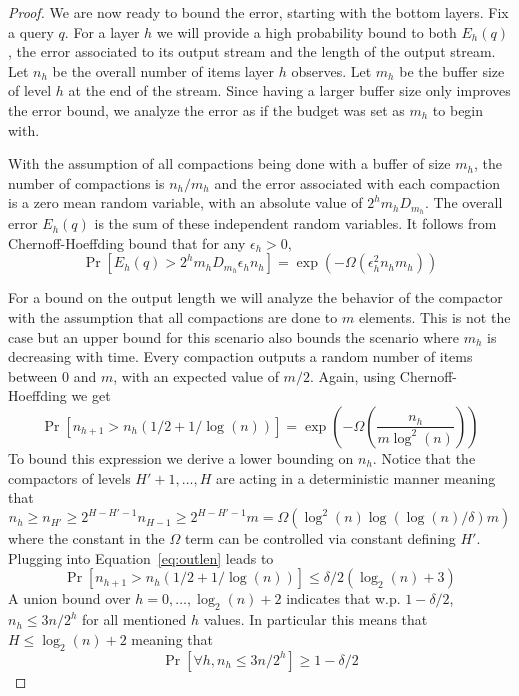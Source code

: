 \documentclass[12pt]{colt2019} %
\newcommand{\eps}{\epsilon}
\begin{document}
\begin{proof}
We are now ready to bound the error, starting with the bottom layers. Fix a query $q$. For a layer $h$ we will provide a high probability bound to both $E_h(q)$, the error associated to its output stream and the length of the output stream. Let $n_h$ be the overall number of items layer $h$ observes. Let $m_h$ be the buffer size of level $h$ at the end of the stream. Since having a larger buffer size only improves the error bound, we analyze the error as if the budget was set as $m_h$ to begin with.

With the assumption of all compactions being done with a buffer of size $m_h$, the number of compactions is $n_h/m_h$ and the error associated with each compaction is a zero mean random variable, with an absolute value of $2^h m_h D_{m_h}$. The overall error $E_h(q)$ is the sum of these independent random variables. It follows from Chernoff-Hoeffding bound that for any $\eps_h > 0$,
\begin{equation} \label{eq:err low1}
\Pr\left[ E_h(q) > 2^h m_h D_{m_h} \eps_h n_h \right] = \exp \left( -\Omega\left( \eps_h^2 n_h m_h \right) \right)
\end{equation}

For a bound on the output length we will analyze the behavior of the compactor with the assumption that all compactions are done to $m$ elements. This is not the case but an upper bound for this scenario also bounds the scenario where $m_h$ is decreasing with time. Every compaction outputs a random number of items between $0$ and $m$, with an expected value of $m/2$. Again, using Chernoff-Hoeffding we get
\begin{equation} \label{eq:outlen}
\Pr\left[ n_{h+1} > n_h(1/2+1/\log(n)) \right] = \exp \left( -\Omega\left( \frac{n_h}{m \log^2(n)} \right) \right) 
\end{equation}
To bound this expression we derive a lower bounding on $n_h$. Notice that the compactors of levels $H'+1,\ldots,H$ are acting in a deterministic manner meaning that 
$$n_h \geq n_{H'} \geq 2^{H-H'-1}n_{H-1} \geq 2^{H-H'-1}m = \Omega(\log^2(n)\log(\log(n)/\delta)m)$$
where the constant in the $\Omega$ term can be controlled via constant defining $H'$. Plugging into Equation~\eqref{eq:outlen} leads to
\begin{equation*} 
\Pr\left[ n_{h+1} > n_h(1/2+1/\log(n)) \right] \leq \delta/2(\log_2(n)+3)
\end{equation*}
A union bound over $h=0,\ldots,\log_2(n)+2$ indicates that w.p. $1-\delta/2$, $n_h \leq 3n/2^h$ for all mentioned $h$ values. In particular this means that $H \leq \log_2(n)+2$ meaning that 
\begin{equation} \label{eq:outlen2}
\Pr\left[ \forall h, n_h \leq 3n/2^h \right] \geq 1-\delta/2
\end{equation}


\end{proof}
\end{document}

